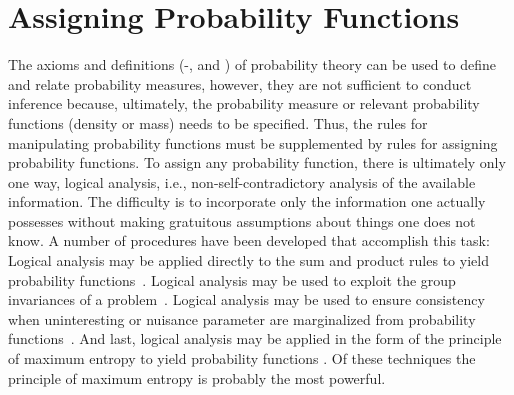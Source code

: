 \chapter{Assigning Probability Functions}
The axioms and definitions (-,  and ) of probability theory can be used to define and relate probability measures, however, they are not sufficient to conduct inference because, ultimately, the probability measure or relevant probability functions (density or mass) needs to be specified. Thus, the rules for manipulating probability functions must be supplemented by rules for assigning probability functions. To assign any probability function, there is ultimately only one way, logical analysis, i.e., non-self-contradictory analysis of the available information. The difficulty is to incorporate only the information one actually possesses without making gratuitous assumptions about things one does not know. A number of procedures have been developed that accomplish this task: Logical analysis may be applied directly to the sum and product rules to yield probability functions~\citep{jaynes_11}. Logical analysis may be used to exploit the group invariances of a problem~\citep{jaynes_16}. Logical analysis may be used to ensure consistency when uninteresting or nuisance parameter are marginalized from probability functions~\citep{jaynes_21}. And last, logical analysis may be applied in the form of the principle of maximum entropy to yield probability functions \cite{zellner_bayesian_inference, jaynes_16,jaynes_19, shore_17,shore_18}. Of these techniques the principle of maximum entropy is probably the most powerful.

